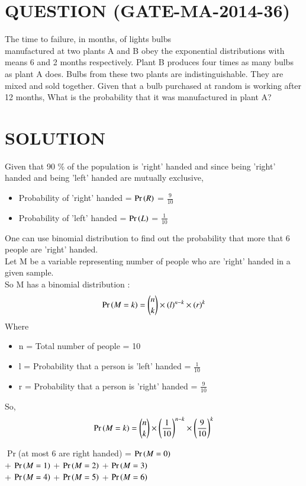 \documentclass[journal,12pt,twocolumn]{IEEEtran}
\begin{document}
\section*{QUESTION (GATE-MA-2014-36)}
The time to failure, in months, of lights bulbs \\manufactured at two plants A and B
obey the exponential distributions with means 6 and 2 months respectively. Plant B produces
four times as many bulbs as plant A does. Bulbs from these two plants are indistinguishable.
They are mixed and sold together. Given that a bulb purchased at random is working after 12 months, What is the probability that it was manufactured in plant A?
\section*{SOLUTION}
Given that 90 \% of the population is 'right' handed and since being 'right' handed and being 'left' handed are mutually exclusive,
\bigskip
\begin{itemize}
    \item Probability of 'right' handed = $\Pr\left(R\right)$ = \(\frac{9}{10}\)
    \item Probability of 'left' handed = $\Pr\left(L\right)$ = \( \frac{1}{10} \)
\end{itemize}
\bigskip
One can use binomial distribution to find out the probability that more that 6 people are 'right' handed.\\
Let M be a variable representing number of people who are 'right' handed in a given sample.\\
So M has a binomial distribution :
\begin{align}
    \Pr\left(M=k\right) = {{n}\choose{k}} \times (l)^{n-k} \times (r)^{k}\label{0.0.1}
\end{align}
Where
\begin{itemize}
    \item n = Total number of people = 10
    \item l = Probability that a person is 'left' handed = \( \frac{1}{10} \)
    \item r = Probability that a person is 'right' handed = \( \frac{9}{10} \)
\end{itemize}
\bigskip
So,
\begin{align}
    \Pr\left(M=k\right) = {{n}\choose{k}} \times \left(\frac{1}{10}\right)^{n-k} \times \left(\frac{9}{10}\right)^{k}\label{0.0.2}
\end{align}
\begin{center}
    $\Pr$(at most 6 are right handed) = $\Pr\left(M = 0\right)$\\+ $\Pr\left(M = 1\right)$ + $\Pr\left(M = 2\right)$ + $\Pr\left(M = 3\right)$ \\+ $\Pr\left(M = 4\right)$ + $\Pr\left(M = 5\right)$ + $\Pr\left(M = 6\right)$\\
\end{center}
\end{document}
